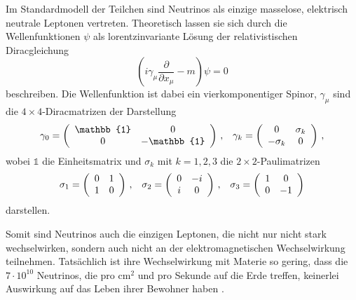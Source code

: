 Im Standardmodell der Teilchen sind Neutrinos als einzige masselose, elektrisch neutrale Leptonen vertreten.
Theoretisch lassen sie sich durch die Wellenfunktionen $\psi$ als lorentzinvariante Lösung der relativistischen Diracgleichung
\begin{equation}
    \left(i \gamma_\mu \frac{\partial}{\partial x_\mu} - m \right) \psi = 0
    \label{eq:dirac}
\end{equation}
beschreiben.
Die Wellenfunktion ist dabei ein vierkomponentiger Spinor, $\gamma_\mu$ sind die $4 \times 4$-Diracmatrizen der Darstellung
\begin{align}
    \gamma_0 = \left( \begin{array}{c c}
        \mathbb{1} & 0          \\ 
        0          & -\mathbb{1} \\ 
        \end{array}\right) \,,
    &&
    \gamma_k = \left( \begin{array}{c c}
        0           & \sigma_k  \\ 
        -\sigma_k   & 0         \\ 
        \end{array}\right) \,,
    \label{eq:gammamatrizen}
\end{align}
wobei $\mathbb{1}$ die Einheitsmatrix und $\sigma_k$ mit $k = 1, 2, 3$ die $2 \times 2$-Paulimatrizen
\begin{align}
    \sigma_1 = \left( \begin{array}{c c}
        0 & 1   \\ 
        1 & 0   \\ 
        \end{array}\right) \,,
    &&
    \sigma_2 = \left( \begin{array}{c c}
        0           & -i  \\ 
        i  & 0         \\ 
        \end{array}\right) \,,
    &&
    \sigma_3 = \left( \begin{array}{c c}
        1           & 0 \\ 
        0   & -1         \\ 
        \end{array}\right)
\end{align}
darstellen. 

Somit sind Neutrinos auch die einzigen Leptonen, die nicht nur nicht stark wechselwirken, sondern auch nicht an der elektromagnetischen Wechselwirkung teilnehmen.
Tatsächlich ist ihre Wechselwirkung mit Materie so gering, dass die $7 \cdot 10^{10}$  Neutrinos, die pro $\si{\centi\meter}^2$ und pro Sekunde auf die Erde treffen, keinerlei Auswirkung
auf das Leben ihrer Bewohner haben \cite[S. ~133]{grupen}. 

